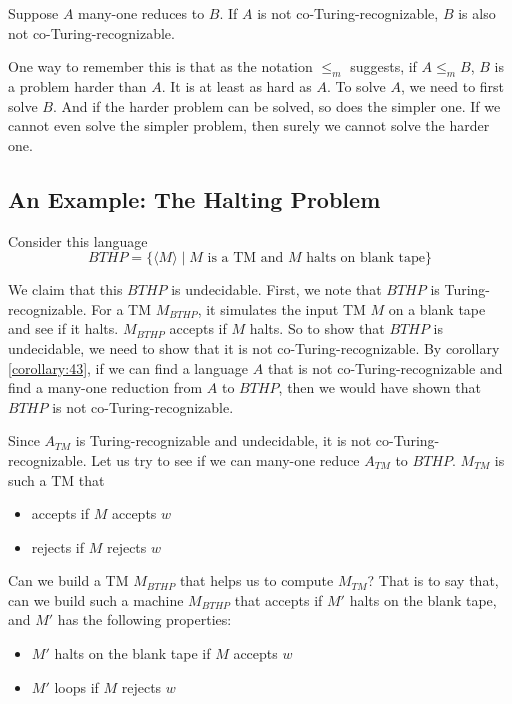 \documentclass[11pt]{article}
\begin{document}
\begin{corollary} \label{corollary:43}
Suppose $A$ many-one reduces to $B$. If $A$ is not co-Turing-recognizable, $B$ is also not
co-Turing-recognizable.
\end{corollary}

One way to remember this is that as the notation $\leq_m$ suggests, if $A \leq_m B$, $B$ is a
problem harder than $A$. It is at least as hard as $A$. To solve $A$, we need to first solve $B$.
And if the harder problem can be solved, so does the simpler one. If we cannot even solve the
simpler problem, then surely we cannot solve the harder one.

\subsection{An Example: The Halting Problem}

Consider this language
\[
  BTHP = \{\langle M \rangle \mid M \text{ is a TM and } M \text{ halts on blank tape}\}
\]

We claim that this $BTHP$ is undecidable. First, we note that $BTHP$ is Turing-recognizable. For a
TM $M_{BTHP}$, it simulates the input TM $M$ on a blank tape and see if it halts. $M_{BTHP}$ accepts
if $M$ halts. So to show that $BTHP$ is undecidable, we need to show that it is not
co-Turing-recognizable. By corollary \ref{corollary:43}, if we can find a language $A$ that is not
co-Turing-recognizable and find a many-one reduction from $A$ to $BTHP$, then we would have shown
that $BTHP$ is not co-Turing-recognizable.

Since $A_{TM}$ is Turing-recognizable and undecidable, it is not co-Turing-recognizable. Let us try
to see if we can many-one reduce $A_{TM}$ to $BTHP$. $M_{TM}$ is such a TM that
\begin{itemize}
\item accepts if $M$ accepts $w$
\item rejects if $M$ rejects $w$
\end{itemize}

Can we build a TM $M_{BTHP}$ that helps us to compute $M_{TM}$? That is to say that, can we build
such a machine $M_{BTHP}$ that accepts if $M'$ halts on the blank tape, and $M'$ has the following
properties:
\begin{itemize}
\item $M'$ halts on the blank tape if $M$ accepts $w$
\item $M'$ loops if $M$ rejects $w$
\end{itemize}
\end{document}
